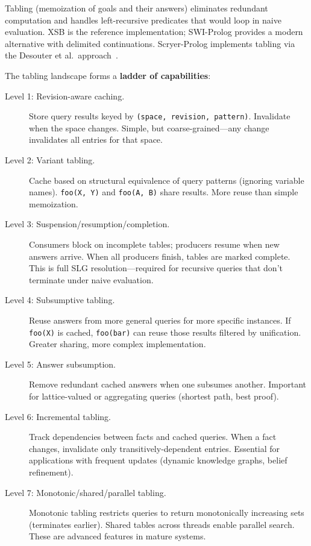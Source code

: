 \documentclass[11pt]{article}
\newcommand{\code}[1]{\texttt{#1}}
\newcommand{\XSB}{\textup{XSB}}
\begin{document}
Tabling (memoization of goals and their answers) eliminates redundant
computation and handles left-recursive predicates that would loop in
naive evaluation.  \XSB{} is the reference implementation; SWI-Prolog
provides a modern alternative with delimited continuations.  Scryer-Prolog
implements tabling via the Desouter et al.\ approach~\cite{DesouterTabling2016}.

The tabling landscape forms a \textbf{ladder of capabilities}:

\begin{description}
\item[Level 1: Revision-aware caching.]
  Store query results keyed by \code{(space, revision, pattern)}.
  Invalidate when the space changes.  Simple, but coarse-grained---any
  change invalidates all entries for that space.

\item[Level 2: Variant tabling.]
  Cache based on structural equivalence of query patterns (ignoring
  variable names).  \code{foo(X, Y)} and \code{foo(A, B)} share results.
  More reuse than simple memoization.

\item[Level 3: Suspension/resumption/completion.]
  Consumers block on incomplete tables; producers resume when new answers
  arrive.  When all producers finish, tables are marked complete.  This
  is full SLG resolution---required for recursive queries that don't
  terminate under naive evaluation.

\item[Level 4: Subsumptive tabling.]
  Reuse answers from more general queries for more specific instances.
  If \code{foo(X)} is cached, \code{foo(bar)} can reuse those results
  filtered by unification.  Greater sharing, more complex implementation.

\item[Level 5: Answer subsumption.]
  Remove redundant cached answers when one subsumes another.  Important
  for lattice-valued or aggregating queries (shortest path, best proof).

\item[Level 6: Incremental tabling.]
  Track dependencies between facts and cached queries.  When a fact
  changes, invalidate only transitively-dependent entries.  Essential
  for applications with frequent updates (dynamic knowledge graphs,
  belief refinement).

\item[Level 7: Monotonic/shared/parallel tabling.]
  Monotonic tabling restricts queries to return monotonically increasing
  sets (terminates earlier).  Shared tables across threads enable
  parallel search.  These are advanced features in mature systems.
\end{description}
\end{document}

